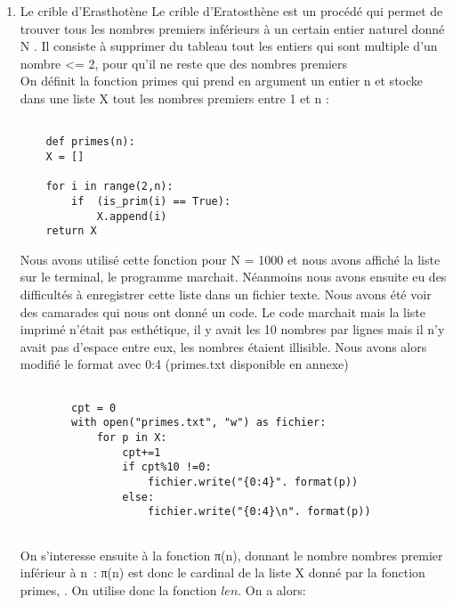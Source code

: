 \documentclass{article}
\begin{document}
\begin{enumerate}
		\begin{lstlisting}[basicstyle=\small]
		def Fermat(n):
			return 2**(2**n) + 1
		\end{lstlisting}
		On teste ensuite les nombres de Fermat $F_k$ pour k allant de 1 à 5
		 à l’aide d’une boucle for :
		 \begin{lstlisting}[basicstyle=\small]
		 for j in range(5):
	print "\n"
	print " Fermat(" , j , ") = " , Fermat(j)
	show_prim(Fermat(j))

		 \end{lstlisting}
	\item Le crible d'Erasthotène
	Le crible d'Eratosthène est un procédé qui permet de trouver tous les
	nombres premiers inférieurs à un certain entier naturel donné N .
Il consiste à supprimer du tableau tout les entiers qui sont multiple
 d'un nombre <= 2, pour qu'il ne reste que des nombres premiers \\
 On définit la fonction primes qui prend en argument un entier n et stocke
 dans une liste X tout les nombres premiers entre 1 et n :

	\begin{lstlisting}[basicstyle=\small]

	def primes(n):
	X = []

	for i in range(2,n):
		if  (is_prim(i) == True):
			X.append(i)
	return X

	\end{lstlisting}
Nous avons utilisé cette fonction pour N = 1000 et nous avons affiché
la liste sur le terminal, le programme marchait. Néanmoins nous avons
 ensuite eu des difficultés à enregistrer cette liste dans un fichier
  texte. Nous avons été voir des camarades qui nous ont donné un code.
	 Le code marchait mais la liste imprimé n’était pas esthétique, il y
	  avait les 10 nombres par lignes mais  il n’y avait pas d’espace entre
		eux, les nombres étaient illisible. Nous avons alors modifié le format avec {0:4}
		(primes.txt disponible en annexe) \\
		\begin{lstlisting}[basicstyle=\small]

		cpt = 0
		with open("primes.txt", "w") as fichier:
			for p in X:
				cpt+=1
				if cpt%10 !=0:
					fichier.write("{0:4}". format(p))
				else:
					fichier.write("{0:4}\n". format(p))


		\end{lstlisting}

		On s’interesse ensuite à la fonction π(n), donnant le nombre
		 nombres premier inférieur à n : π(n) est donc le cardinal
		 de la liste X donné par la fonction primes, . On utilise donc la fonction $len$.
		  On a alors:


\end{enumerate}
\end{document}
